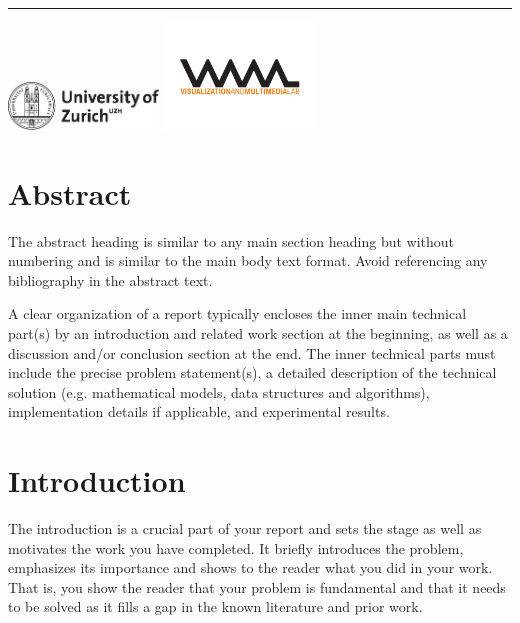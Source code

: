\documentclass[11pt, a4paper,oneside,chapterprefix=false]{scrbook}
\begin{document}
\begin{titlepage}
	\vfill
	\hrule
	\vspace{0.5cm}
	\includegraphics*[width=0.3\textwidth]{figures/uzh_logo} \hfill
	\includegraphics*[width=0.3\textwidth]{figures/vmml_logo}
\end{titlepage}

\chapter{Abstract} \label{chp:abstract}

The abstract heading is similar to any main section heading but without numbering and is similar to the main body text format. Avoid referencing any bibliography in the abstract text.

A clear organization of a report typically encloses the inner main technical part(s) by an introduction and related work section at the beginning, as well as a discussion and/or conclusion section at the end. The inner technical parts must include the precise problem statement(s), a detailed description of the technical solution (e.g. mathematical models, data structures and algorithms), implementation details if applicable, and experimental results.


\tableofcontents

\mainmatter

\chapter{Introduction} \label{chp:introduction}

The introduction is a crucial part of your report and sets the stage as well as motivates the work you have completed. It briefly introduces the problem, emphasizes its importance and shows to the reader what you did in your work. That is, you show the reader that your problem is fundamental and that it needs to be solved as it fills a gap in the known literature and prior work.
\end{document}
